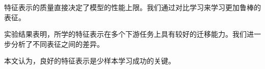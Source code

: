 特征表示的质量直接决定了模型的性能上限。我们通过对比学习来学习更加鲁棒的表征。

实验结果表明，所学的特征表示在多个下游任务上具有较好的迁移能力。我们进一步分析了不同表征之间的差异。

本文认为，良好的特征表示是少样本学习成功的关键。
